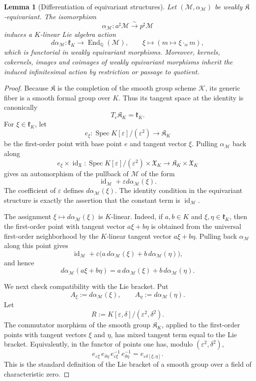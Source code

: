 \documentclass[11pt]{amsart}
\theoremstyle{plain}
\newtheorem{lemma}{Lemma}[section]
\theoremstyle{definition}
\theoremstyle{remark}
\begin{document}
\begin{lemma}[Differentiation of equivariant structures]
\label{lem:differentiation-equivariant-structures}
Let \((\mathcal M,\alpha_{\mathcal M})\) be weakly
\(\mathfrak K\)-equivariant.  The isomorphism
\[
  \alpha_{\mathcal M}:a^\sharp\mathcal M\xrightarrow{\sim}p^\sharp\mathcal M
\]
induces a \(K\)-linear Lie algebra action
\[
  d\alpha_{\mathcal M}:\mathfrak k_K\longrightarrow
  \operatorname{End}_{\mathbb Q}(\mathcal M),
  \qquad
  \xi\longmapsto (m\mapsto \xi\cdot_\alpha m),
\]
which is functorial in weakly equivariant morphisms.  Moreover, kernels,
cokernels, images and coimages of weakly equivariant morphisms inherit the
induced infinitesimal action by restriction or passage to quotient.
\end{lemma}


\begin{proof}
Because \(\mathfrak K\) is the completion of the smooth group scheme
\(\mathcal K\), its generic fiber is a smooth formal group over \(K\). Thus
its tangent space at the identity is canonically
\[
  T_e\mathfrak K_K=\mathfrak k_K.
\]
For \(\xi\in\mathfrak k_K\), let
\[
  e_\xi:\operatorname{Spec}K[\varepsilon]/(\varepsilon^2)
  \longrightarrow \mathfrak K_K
\]
be the first-order point with base point \(e\) and tangent vector \(\xi\).
Pulling \(\alpha_{\mathcal M}\) back along
\[
  e_\xi\times \operatorname{id}_{\mathfrak X}:
  \operatorname{Spec}K[\varepsilon]/(\varepsilon^2)\times \mathfrak X_K
  \longrightarrow \mathfrak K_K\times \mathfrak X_K
\]
gives an automorphism of the pullback of \(\mathcal M\) of the form
\[
  \operatorname{id}_{\mathcal M}+\varepsilon d\alpha_{\mathcal M}(\xi).
\]
The coefficient of \(\varepsilon\) defines \(d\alpha_{\mathcal M}(\xi)\). The
identity condition in the equivariant structure is exactly the assertion that
the constant term is \(\operatorname{id}_{\mathcal M}\).

The assignment \(\xi\mapsto d\alpha_{\mathcal M}(\xi)\) is \(K\)-linear. Indeed,
if \(a,b\in K\) and \(\xi,\eta\in\mathfrak k_K\), then the first-order point
with tangent vector \(a\xi+b\eta\) is obtained from the universal first-order
neighborhood by the \(K\)-linear tangent vector \(a\xi+b\eta\). Pulling back
\(\alpha_{\mathcal M}\) along this point gives
\[
  \operatorname{id}_{\mathcal M}
  +\varepsilon\bigl(a\,d\alpha_{\mathcal M}(\xi)
  +b\,d\alpha_{\mathcal M}(\eta)\bigr),
\]
and hence
\[
  d\alpha_{\mathcal M}(a\xi+b\eta)
  =a\,d\alpha_{\mathcal M}(\xi)+b\,d\alpha_{\mathcal M}(\eta).
\]

We next check compatibility with the Lie bracket. Put
\[
  A_\xi:=d\alpha_{\mathcal M}(\xi),
  \qquad
  A_\eta:=d\alpha_{\mathcal M}(\eta).
\]
Let
\[
  R:=K[\varepsilon,\delta]/(\varepsilon^2,\delta^2).
\]
The commutator morphism of the smooth group \(\mathfrak K_K\), applied to the
first-order points with tangent vectors \(\xi\) and \(\eta\), has mixed tangent
term equal to the Lie bracket. Equivalently, in the functor of points one has,
modulo \((\varepsilon^2,\delta^2)\),
\[
  e_{\varepsilon\xi}\,e_{\delta\eta}\,
  e_{\varepsilon\xi}^{-1}\,e_{\delta\eta}^{-1}
  =e_{\varepsilon\delta[\xi,\eta]}.
\]
This is the standard definition of the Lie bracket of a smooth group over a
field of characteristic zero.


\end{proof}
\end{document}
